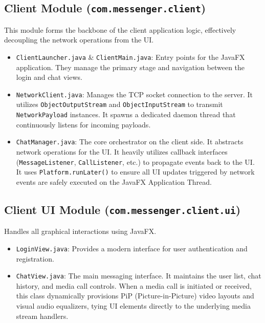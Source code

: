 \documentclass[12pt,a4paper]{article}
\begin{document}
\subsection{Client Module (\texttt{com.messenger.client})}
This module forms the backbone of the client application logic, effectively decoupling the network operations from the UI.
\begin{itemize}
    \item \texttt{ClientLauncher.java} \& \texttt{ClientMain.java}: Entry points for the JavaFX application. They manage the primary stage and navigation between the login and chat views.
    \item \texttt{NetworkClient.java}: Manages the TCP socket connection to the server. It utilizes \texttt{ObjectOutputStream} and \texttt{ObjectInputStream} to transmit \texttt{NetworkPayload} instances. It spawns a dedicated daemon thread that continuously listens for incoming payloads.
    \item \texttt{ChatManager.java}: The core orchestrator on the client side. It abstracts network operations for the UI. It heavily utilizes callback interfaces (\texttt{MessageListener}, \texttt{CallListener}, etc.) to propagate events back to the UI. It uses \texttt{Platform.runLater()} to ensure all UI updates triggered by network events are safely executed on the JavaFX Application Thread.
\end{itemize}

\subsection{Client UI Module (\texttt{com.messenger.client.ui})}
Handles all graphical interactions using JavaFX.
\begin{itemize}
    \item \texttt{LoginView.java}: Provides a modern interface for user authentication and registration.
    \item \texttt{ChatView.java}: The main messaging interface. It maintains the user list, chat history, and media call controls. When a media call is initiated or received, this class dynamically provisions PiP (Picture-in-Picture) video layouts and visual audio equalizers, tying UI elements directly to the underlying media stream handlers.
\end{itemize}
\end{document}
